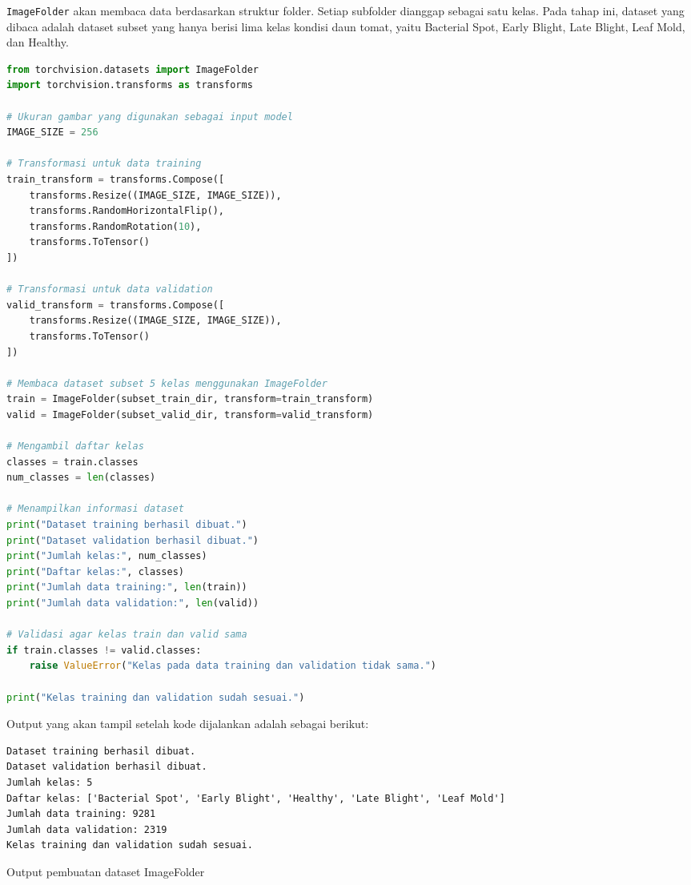 \texttt{ImageFolder} akan membaca data berdasarkan struktur folder. Setiap subfolder dianggap sebagai satu kelas. Pada tahap ini, dataset yang dibaca adalah dataset subset yang hanya berisi lima kelas kondisi daun tomat, yaitu Bacterial Spot, Early Blight, Late Blight, Leaf Mold, dan Healthy.

\begin{lstlisting}[language=Python, caption=Membuat dataset dengan ImageFolder]
from torchvision.datasets import ImageFolder
import torchvision.transforms as transforms

# Ukuran gambar yang digunakan sebagai input model
IMAGE_SIZE = 256

# Transformasi untuk data training
train_transform = transforms.Compose([
    transforms.Resize((IMAGE_SIZE, IMAGE_SIZE)),
    transforms.RandomHorizontalFlip(),
    transforms.RandomRotation(10),
    transforms.ToTensor()
])

# Transformasi untuk data validation
valid_transform = transforms.Compose([
    transforms.Resize((IMAGE_SIZE, IMAGE_SIZE)),
    transforms.ToTensor()
])

# Membaca dataset subset 5 kelas menggunakan ImageFolder
train = ImageFolder(subset_train_dir, transform=train_transform)
valid = ImageFolder(subset_valid_dir, transform=valid_transform)

# Mengambil daftar kelas
classes = train.classes
num_classes = len(classes)

# Menampilkan informasi dataset
print("Dataset training berhasil dibuat.")
print("Dataset validation berhasil dibuat.")
print("Jumlah kelas:", num_classes)
print("Daftar kelas:", classes)
print("Jumlah data training:", len(train))
print("Jumlah data validation:", len(valid))

# Validasi agar kelas train dan valid sama
if train.classes != valid.classes:
    raise ValueError("Kelas pada data training dan validation tidak sama.")

print("Kelas training dan validation sudah sesuai.")
\end{lstlisting}

Output yang akan tampil setelah kode dijalankan adalah sebagai berikut:

\begin{outputcode}[H]
\begin{lstlisting}[language={}]
Dataset training berhasil dibuat.
Dataset validation berhasil dibuat.
Jumlah kelas: 5
Daftar kelas: ['Bacterial Spot', 'Early Blight', 'Healthy', 'Late Blight', 'Leaf Mold']
Jumlah data training: 9281
Jumlah data validation: 2319
Kelas training dan validation sudah sesuai.
\end{lstlisting}
\caption{Output pembuatan dataset ImageFolder}
\end{outputcode}

